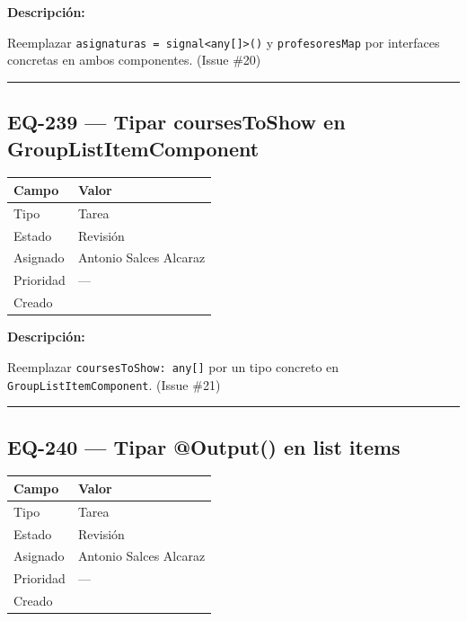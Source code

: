 \documentclass[
  spanish,
  11pt,
]{report}
\newcounter{none} %
\begin{document}
\textbf{Descripción:}

Reemplazar
\texttt{asignaturas\ =\ signal\textless{}any{[}{]}\textgreater{}()} y
\texttt{profesoresMap} por interfaces concretas en ambos componentes.
(Issue \#20)

\begin{center}\rule{0.5\linewidth}{0.5pt}\end{center}

\subsection{EQ-239 --- Tipar coursesToShow en
GroupListItemComponent}\label{eq-239-tipar-coursestoshow-en-grouplistitemcomponent}

{\def\LTcaptype{none} %
\begin{longtable}[]{@{}ll@{}}
\toprule\noalign{}
Campo & Valor \\
\midrule\noalign{}
\endhead
\bottomrule\noalign{}
\endlastfoot
Tipo & Tarea \\
Estado & Revisión \\
Asignado & Antonio Salces Alcaraz \\
Prioridad & --- \\
Creado & \\
\end{longtable}
}

\textbf{Descripción:}

Reemplazar \texttt{coursesToShow:\ any{[}{]}} por un tipo concreto en
\texttt{GroupListItemComponent}. (Issue \#21)

\begin{center}\rule{0.5\linewidth}{0.5pt}\end{center}

\subsection{EQ-240 --- Tipar @Output() en list
items}\label{eq-240-tipar-output-en-list-items}

{\def\LTcaptype{none} %
\begin{longtable}[]{@{}ll@{}}
\toprule\noalign{}
Campo & Valor \\
\midrule\noalign{}
\endhead
\bottomrule\noalign{}
\endlastfoot
Tipo & Tarea \\
Estado & Revisión \\
Asignado & Antonio Salces Alcaraz \\
Prioridad & --- \\
Creado & \\
\end{longtable}
}
\end{document}
